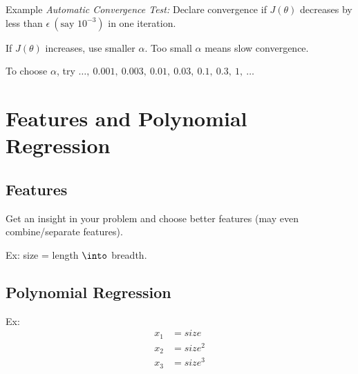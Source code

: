 Example \emph{Automatic Convergence Test:} Declare convergence if $J(\theta)$
decreases by less than $\epsilon\ (\text{say } 10^{-3})$ in one iteration.

If $J(\theta)$ increases, use smaller $\alpha$. Too small $\alpha$ means slow convergence.

To choose $\alpha$, try $\dots,\ 0.001,\ 0.003,\ 0.01,\ 0.03,\ 0.1,\ 0.3,\ 1,\ \dots$

\section{Features and Polynomial Regression}
\subsection{Features}
Get an insight in your problem and choose better features (may even combine/separate features).

Ex: size = length $\into$ breadth.

\subsection{Polynomial Regression}
Ex: \begin{align*}
    x_1 & = size   \\
    x_2 & = size^2 \\
    x_3 & = size^3 \\
\end{align*}


